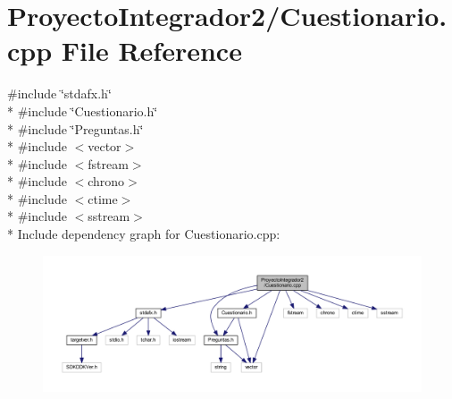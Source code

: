 \section{Proyecto\-Integrador2/\-Cuestionario.cpp File Reference}
\label{_cuestionario_8cpp}
{\ttfamily \#include \char`\"{}stdafx.\-h\char`\"{}}\\*
{\ttfamily \#include \char`\"{}Cuestionario.\-h\char`\"{}}\\*
{\ttfamily \#include \char`\"{}Preguntas.\-h\char`\"{}}\\*
{\ttfamily \#include $<$vector$>$}\\*
{\ttfamily \#include $<$fstream$>$}\\*
{\ttfamily \#include $<$chrono$>$}\\*
{\ttfamily \#include $<$ctime$>$}\\*
{\ttfamily \#include $<$sstream$>$}\\*
Include dependency graph for Cuestionario.\-cpp\-:\nopagebreak
\begin{figure}[H]
\begin{center}
\leavevmode
\includegraphics[width=350pt]{_cuestionario_8cpp__incl}
\end{center}
\end{figure}
